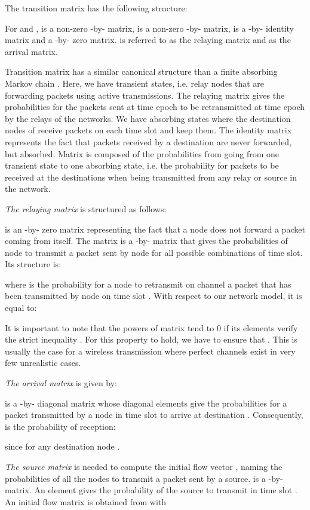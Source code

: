 \documentclass[a4paper]{article}
\begin{document}
The transition matrix  has the following structure:
 
\noindent For  and ,  is a non-zero -by- matrix,  is a non-zero -by- matrix,  is a -by- identity matrix and  a  -by- zero matrix.  is referred to as the relaying matrix and  as the arrival matrix. 

Transition matrix  has a similar canonical structure than a finite absorbing Markov chain \cite{markov}. Here, we have  transient states, i.e. relay nodes that are forwarding packets using active transmissions. The relaying matrix  gives the probabilities for the packets sent at time epoch  to be retransmitted at time epoch  by the relays of the networks. 
We have  absorbing states where the destination nodes of  receive packets on each time slot and keep them. The identity matrix represents the fact that packets received by a destination are never forwarded, but absorbed.  Matrix  is composed of the probabilities from going from one transient state to one absorbing state, i.e. the probability for packets to be received at the destinations when being transmitted from any relay or source in the network. 

\emph{The relaying matrix } is structured as follows:

 is an -by- zero matrix representing the fact that a node  does not forward a packet coming from itself. The matrix  is a -by- matrix that gives the probabilities of node  to transmit a packet sent by node  for all possible combinations of time slot. Its structure is:

\noindent where  is the probability for a node  to retransmit on channel  a packet that has been transmitted by node  on time slot . With respect to our network model, it is equal to:
 
It is important to note that the powers of matrix  tend to 0 if its elements verify the strict inequality . For this property to hold, we have to ensure that . This is usually the case for a wireless transmission where perfect channels exist in very few unrealistic cases.

\emph{The arrival matrix } is given by:

\noindent  is a -by- diagonal matrix whose diagonal elements  give the probabilities for a packet transmitted by a node  in time slot  to arrive at destination .  Consequently,  is the probability of reception:

\noindent since  for any destination node .

\emph{The source matrix } is needed to compute the initial flow vector , naming the probabilities of all the nodes to transmit a packet sent by a source.  is a -by- matrix. An element  gives the probability of the source  to transmit in time slot . An initial flow matrix is obtained from  with
\end{document}
